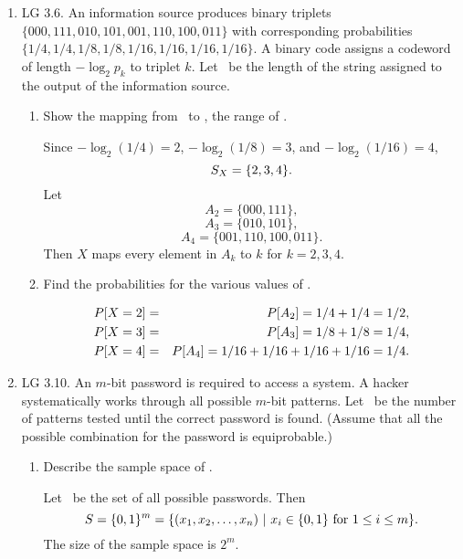 \begin{enumerate}
	\item LG 3.6.
	An information source produces binary triplets
	$\{000, 111, 010, 101, 001, 110, 100, 011\}$
	with corresponding probabilities
	$\{1/4, 1/4, 1/8, 1/8, 1/16, 1/16, 1/16, 1/16\}$.
	A binary code assigns a codeword of length $-\log_2 p_k$
	to triplet $k$.
	Let \X\ be the length of the string assigned to the output of the information source.
	\begin{enumerate}
		\item Show the mapping from \sspace\ to \ssx,
		the range of \X.
		\ifdefined\sol
		\begin{solution}
			Since $-\log_2 (1/4) = 2$, $-\log_2 (1/8) = 3$, and $-\log_2 (1/16) = 4$,
			\[
				S_X = \{2,3,4\}.
			\]
			Let
			\[ A_2 = \{ 000, 111 \}, \]
			\[ A_3 = \{ 010, 101 \}, \]
			\[ A_4 = \{ 001, 110, 100, 011 \}. \]
			Then $X$ maps every element in $A_k$ to $k$
			for $k=2,3,4$.
		\end{solution}
		\fi

		\item Find the probabilities for the various values of \X.
		\ifdefined\sol
		\begin{solution}
		\begin{eqnarray*}
			P[X=2] &=& P[A_2] = 1/4 + 1/4 = 1/2,
			\\P[X=3] &=& P[A_3] = 1/8 + 1/8 = 1/4,
			\\P[X=4] &=& P[A_4] = 1/16 + 1/16 + 1/16 + 1/16 = 1/4.
		\end{eqnarray*}
		\end{solution}
		\fi

	\end{enumerate}

	\item LG 3.10.
	An $m$-bit password
	is required to access a system.
	A hacker systematically works through all possible $m$-bit patterns.
	Let \X\ be the number of patterns
	tested until the correct password is found.
	(Assume that all the possible combination for the password
	is equiprobable.)
	\begin{enumerate}
		\item Describe the sample space of \sspace.
		\ifdefined\sol
		\begin{solution}
		Let \sspace\ be the set of all possible
		passwords. Then
		\[
			S  =  \{0,1\}^m
			= \{({x}_1, {x}_2, \ldots, {x}_{n} )~|~x_i\in\{0,1\}\mbox{ for } 1\leq i\leq m\}.
		\]
		The size of the sample space is $2^m$.
		\end{solution}
		\fi


\end{enumerate}
\end{enumerate}
